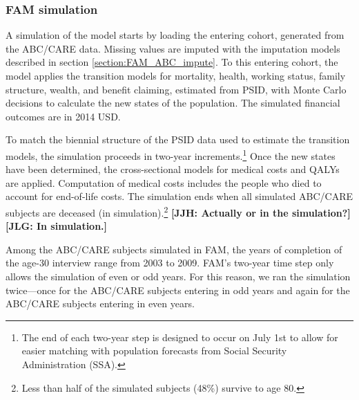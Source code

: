 


\subsubsection{FAM simulation}
\label{appendix:health-fam-simulation}

\noindent A simulation of the model starts by loading the entering cohort, generated from the ABC/CARE data. Missing values are imputed with the imputation models described in section \ref{section:FAM_ABC_impute}. To this entering cohort, the model applies the transition models for mortality, health, working status, family structure, wealth, and benefit claiming, estimated from PSID, with Monte Carlo decisions to calculate the new states of the population.
The simulated financial outcomes are in 2014 USD.


\noindent To match the biennial structure of the PSID data used to estimate the transition models, the simulation proceeds in two-year increments.\footnote{The end of each two-year step is designed to occur on July 1st to allow for easier matching with population forecasts from Social Security Administration (SSA).}
Once the new states have been determined, the cross-sectional models for medical costs and QALYs are applied.
Computation of medical costs includes the people who died to account for end-of-life costs.
The simulation ends when all simulated ABC/CARE subjects are deceased (in simulation).\footnote{Less than half of the simulated subjects (48\%) survive to age 80.} \textbf{[JJH: Actually or in the simulation?] [JLG: In simulation.]}

\noindent Among the ABC/CARE subjects simulated in FAM, the years of completion of the age-30 interview range from 2003 to 2009.
FAM's two-year time step only allows the simulation of even or odd years.
For this reason, we ran the simulation twice---once for the ABC/CARE subjects entering in odd years and again for the ABC/CARE subjects entering in even years.

